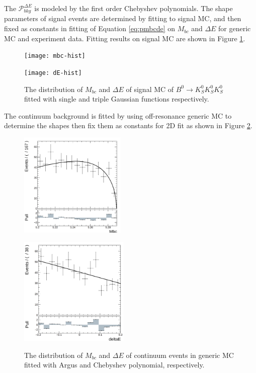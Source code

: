  The $\mathcal{P}_{bkg}^{\Delta{E}}$ is modeled by the first order Chebyshev polynomials. The shape parameters of signal events are determined by fitting to signal MC, and  then fixed as constants in fitting of Equation \ref{eq:pmbcde} on $M_{bc}$ and $\Delta E$ for generic MC and experiment data. Fitting results on signal MC are shown in Figure \ref{fig:mbcde1D}. 
 \begin{figure}[htbp]
 	\begin{minipage}[b]{0.5\linewidth}
 		\centering 
 		\texttt{[image: mbc-hist]}
 	\end{minipage}
 	\begin{minipage}[b]{0.5\linewidth}
 		\centering 
 		\texttt{[image: dE-hist]}
 	\end{minipage}
 	\caption{The distribution of $M_{bc}$ and $\Delta E$ of signal MC of $B^0 \to K_S^0  K_S^0  K_S^0$ fitted with single and triple Gaussian functions respectively.}
 	\label{fig:mbcde1D}
 \end{figure}
The continuum background is fitted by using off-resonance generic MC to determine the shapes then fix them as constants for 2D fit as shown in Figure \ref{fig:bkgmbcde}.
\begin{figure}[htbp]
	\begin{minipage}[b]{0.5\linewidth}
		\centering 
		\includegraphics[height=5cm]{figures/mbc-cs-hist}
		\label{}
	\end{minipage}
	\begin{minipage}[b]{0.5\linewidth}
		\centering 
		\includegraphics[height=5.2cm]{figures/dE-cs-hist}
		\label{}
	\end{minipage}
	\caption{The distribution of $M_{bc}$ and $\Delta E$ of continuum events in generic MC fitted with Argus and Chebyshev polynomial, respectively.}
	\label{fig:bkgmbcde}
\end{figure}

